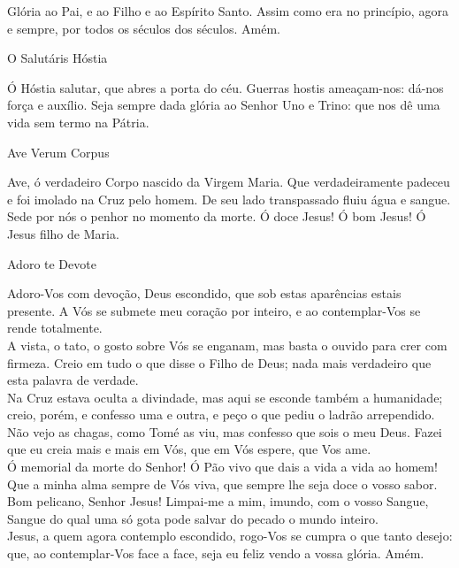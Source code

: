 \documentclass{book}
\begin{document}
\begin{flushleft}
    Glória ao Pai, e ao Filho e ao Espírito Santo. Assim como era no princípio, agora e sempre, por todos os séculos dos séculos. Amém.
\end{flushleft}
\begin{center}
    O Salutáris Hóstia
\end{center}
\begin{flushleft}
    Ó Hóstia salutar, que abres a porta do céu. Guerras hostis ameaçam-nos: dá-nos força e auxílio. Seja sempre dada glória ao Senhor Uno e Trino: que nos dê uma vida sem termo na Pátria.
\end{flushleft}
\begin{center}
    Ave Verum Corpus
\end{center}
\begin{flushleft}
    Ave, ó verdadeiro Corpo nascido da Virgem Maria. Que verdadeiramente padeceu e foi imolado na Cruz pelo homem. De seu lado transpassado fluiu água e sangue. Sede por nós o penhor no momento da morte. Ó doce Jesus! Ó bom Jesus! Ó Jesus filho de Maria.
\end{flushleft}
\begin{center}
    Adoro te Devote
\end{center}
\begin{flushleft}
    Adoro-Vos com devoção, Deus escondido, que sob estas aparências estais presente. A Vós se submete meu coração por inteiro, e ao contemplar-Vos se rende totalmente.
    \vspace{.2cm} \\
    A vista, o tato, o gosto sobre Vós se enganam, mas basta o ouvido para crer com firmeza. Creio em tudo o que disse o Filho de Deus; nada mais verdadeiro que esta palavra de verdade.
    \vspace{.2cm} \\
    Na Cruz estava oculta a divindade, mas aqui se esconde também a humanidade; creio, porém, e confesso uma e outra, e peço o que pediu o ladrão arrependido.
    \vspace{.2cm} \\
    Não vejo as chagas, como Tomé as viu, mas confesso que sois o meu Deus. Fazei que eu creia mais e mais em Vós, que em Vós espere, que Vos ame.
    \vspace{.2cm} \\
    Ó memorial da morte do Senhor! Ó Pão vivo que dais a vida a vida ao homem! Que a minha alma sempre de Vós viva, que sempre lhe seja doce o vosso sabor.
    \vspace{.2cm} \\
    Bom pelicano, Senhor Jesus! Limpai-me a mim, imundo, com o vosso Sangue, Sangue do qual uma só gota pode salvar do pecado o mundo inteiro.\
    \vspace{.2cm} \\
    Jesus, a quem agora contemplo escondido, rogo-Vos se cumpra o que tanto desejo: que, ao contemplar-Vos face a face, seja eu feliz vendo a vossa glória. Amém.
\end{flushleft}
\end{document}
